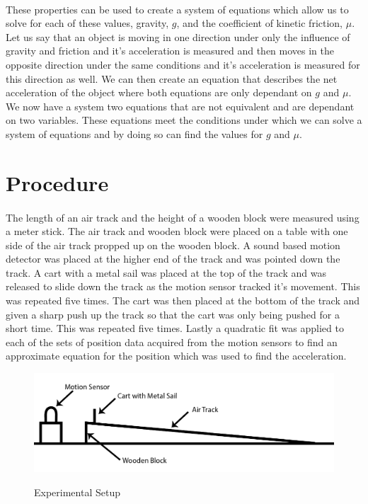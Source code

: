 \documentclass[12pt]{article}
\begin{document}
       \paragraph{} These properties can be used to create a system of equations which allow us to solve for each of these values, gravity, $g$, and the coefficient of kinetic 
       friction, $\mu$. Let us say that an object is moving in one direction under only the influence of gravity and friction and it's acceleration is measured and then moves in the opposite 
       direction under the same conditions and it's acceleration is measured for this direction as well. We can then create an equation that describes the net acceleration 
       of the object where both equations are only dependant on \(g\) and \(\mu\). We now have a system two equations that are not equivalent and are dependant on two variables. 
       These equations meet the conditions under which we can solve a system of equations and by doing so can find the values for \(g\) and \(\mu\).
    \section{Procedure}
    \paragraph{}The length of an air track and the height of a wooden block were measured using a meter stick. The air track
        and wooden block were placed on a table with one side of the air track propped up on the wooden block. A sound based
        motion detector was placed at the higher end of the track and was pointed down the track. A cart with a metal sail was placed at the top of the track and 
        was released to slide down the track as the motion sensor tracked it's movement. This was repeated five times. The cart was then placed at the bottom of the 
        track and given a sharp push up the track so that the cart was only being pushed for a short time. This was repeated five times. Lastly a quadratic fit was applied 
        to each of the sets of position data acquired from the motion sensors to find an approximate equation for the position which was used to find the acceleration.
        \begin{figure}[h]
            \caption{Experimental Setup}
            \includegraphics[width=\linewidth]{Figure 1 - Experiment Setup.png}
            \label{fig:setup}
        \end{figure}
\end{document}
